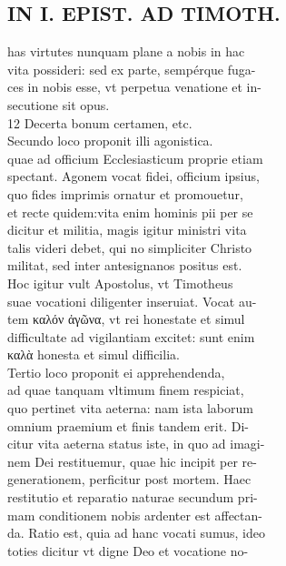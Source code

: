 \documentclass{article}
\begin{document}
\begin{pages}
\section*{IN I. EPIST. AD TIMOTH. \\
                }
has virtutes nunquam plane a nobis in hac \\
                vita possideri: sed ex parte, sempérque fuga- \\
                ces in nobis esse, vt perpetua venatione et in- \\
                secutione sit opus. \\
                12 Decerta bonum certamen, etc. \\
                Secundo loco proponit illi agonistica. \\
                quae ad officium Ecclesiasticum proprie etiam \\
                spectant. Agonem vocat fidei, officium ipsius, \\
                quo fides imprimis ornatur et promouetur, \\
                et recte quidem:vita enim hominis pii per se \\
                dicitur et militia, magis igitur ministri vita \\
                talis videri debet, qui no simpliciter Christo \\
                militat, sed inter antesignanos positus est. \\
                Hoc igitur vult Apostolus, vt Timotheus \\
                suae vocationi diligenter inseruiat. Vocat au- \\
                tem καλόν ἀγῶνα, vt rei honestate et simul \\
                difficultate ad vigilantiam excitet: sunt enim \\
                καλὰ honesta et simul difficilia. \\
                Tertio loco proponit ei apprehendenda, \\
                ad quae tanquam vltimum finem respiciat, \\
                quo pertinet vita aeterna: nam ista laborum \\
                omnium praemium et finis tandem erit. Di- \\
                citur vita aeterna status iste, in quo ad imagi- \\
                nem Dei restituemur, quae hic incipit per re- \\
                generationem, perficitur post mortem. Haec \\
                restitutio et reparatio naturae secundum pri- \\
                mam conditionem nobis ardenter est affectan- \\
                da. Ratio est, quia ad hanc vocati sumus, ideo \\
                toties dicitur vt digne Deo et vocatione no- \\
                

\end{pages}
\end{document}
